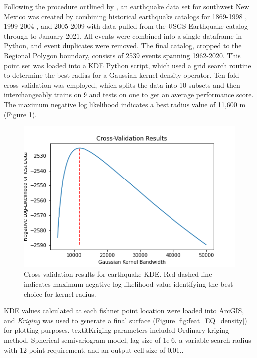 Following the procedure outlined by \citet{pepin_new_2018}, an earthquake data set for southwest New Mexico was created by combining historical earthquake catalogs for 1869-1998 \citep{sanford_earthquake_2002}, 1999-2004 \citep{sanford_earthquake_2006}, and 2005-2009 \citep{pursley_earthquake_2013} with data pulled from the USGS Earthquake catalog \citep{usgs_earthquake_2021} through to January 2021. All events were combined into a single dataframe in Python, and event duplicates were removed. The final catalog, cropped to the Regional Polygon boundary, consists of 2539 events spanning 1962-2020. This point set was loaded into a KDE Python script, which used a grid search routine to determine the best radius for a Gaussian kernel density operator. Ten-fold cross validation was employed, which splits the data into 10 subsets and then interchangeably trains on 9 and tests on one to get an average performance score. The maximum negative log likelihood indicates a best radius value of 11,600 m (Figure \ref{fig:EQ_cv}). 

\begin{figure}[!htp]
\centering
\includegraphics[scale=.50]{templates/images/Figure-Earthquake_kde_gridsearchcv_result.png}
\caption[Earthquake density parameter tuning]{Cross-validation results for earthquake KDE. Red dashed line indicates maximum negative log likelihood value identifying the best choice for kernel radius.}
\label{fig:EQ_cv}
\end{figure}

KDE values calculated at each fishnet point location were loaded into ArcGIS, and \textit{Kriging} was used to generate a final surface (Figure \ref{fig:feat_EQ_density}) for plotting purposes. textit{Kriging} parameters included Ordinary kriging method, Spherical semivariogram model, lag size of 1e-6, a variable search radius with 12-point requirement, and an output cell size of 0.01.. 

